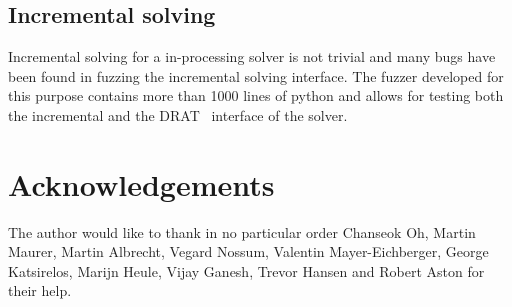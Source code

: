 \documentclass[final]{ieee}
\begin{document}
\subsection{Incremental solving}
Incremental solving for a in-processing solver is not trivial and many bugs have been found in fuzzing the incremental solving interface. The fuzzer developed for this purpose contains more than 1000 lines of python and allows for testing both the incremental and the DRAT~\cite{drat} interface of the solver.

\section*{Acknowledgements}
The author would like to thank in no particular order Chanseok Oh, Martin Maurer, Martin Albrecht, Vegard Nossum, Valentin Mayer-Eichberger, George Katsirelos, Marijn Heule, Vijay Ganesh, Trevor Hansen and Robert Aston for their help.




\vfill
\pagebreak
\end{document}

